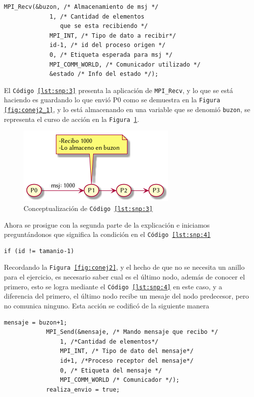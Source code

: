\documentclass{article}
\begin{document}
\begin{lstlisting}[caption={ 1ra parte MPI\_Recv - Fragmento de \texttt{C\'odigo \ref{lst:mpi2}}},
label=lst:snp:3, firstnumber=29]
		MPI_Recv(&buzon, /* Almacenamiento de msj */
			 1, /* Cantidad de elementos
				que se esta recibiendo */
			 MPI_INT, /* Tipo de dato a recibir*/
			 id-1, /* id del proceso origen */
			 0, /* Etiqueta esperada para msj */
			 MPI_COMM_WORLD, /* Comunicador utilizado */
			 &estado /* Info del estado */);
\end{lstlisting}

El \texttt{C\'odigo \ref{lst:snp:3}} presenta la aplicaci\'on de
\texttt{MPI\_Recv}, y lo que se est\'a haciendo es guardando lo que envi\'o
P0 como se demuestra en la \texttt{Figura \ref{fig:conej2_1}}, y lo est\'a
almacenando en una variable que se denomi\'o \texttt{buzon}, se representa el
curso de  acci\'on en la \texttt{Figura \ref{fig:conej2_2}}.

\begin{figure}[H]
  \centering
  \includegraphics[width=.4\linewidth]{EJ2_002}
  \caption{Conceptualizaci\'on de \texttt{C\'odigo \ref{lst:snp:3}}}
  \label{fig:conej2_2}
\end{figure}

Ahora se prosigue con la segunda parte de la explicaci\'on e iniciamos
pregunt\'andonos que significa la condici\'on en el \texttt{C\'odigo \ref{lst:snp:4}}

\begin{lstlisting}[caption={Condici\'on para detectar \'ultimo proceso},
label=lst:snp:4, firstnumber=37]
	if (id != tamanio-1)
\end{lstlisting}

Recordando la \texttt{Figura \ref{fig:conej2}}, y el hecho de que no se
necesita un anillo para el ejercicio, es necesario saber cual es el \'ultimo
nodo, adem\'as de conocer el primero, esto se logra mediante el \texttt{C\'odigo \ref{lst:snp:4}}
en este caso, y a diferencia del primero, el \'ultimo nodo recibe un mesaje del
nodo predecesor, pero no comunica ninguno.
Esta acci\'on se codific\'o de la siguiente manera

\begin{lstlisting}[caption={ 2da parte MPI\_Recv - Fragmento de \texttt{C\'odigo \ref{lst:mpi2}}},
label=lst:snp:5, firstnumber=38]
			mensaje = buzon+1;
			MPI_Send(&mensaje, /* Mando mensaje que recibo */
				1, /*Cantidad de elementos*/
				MPI_INT, /* Tipo de dato del mensaje*/
				id+1, /*Proceso receptor del mensaje*/
				0, /* Etiqueta del mensaje */
				MPI_COMM_WORLD /* Comunicador */);
			realiza_envio = true;
\end{lstlisting}
\end{document}
